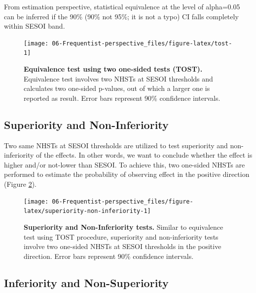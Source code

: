 \documentclass[
]{book}
\begin{document}
From estimation perspective, statistical equivalence at the level of alpha=0.05 can be inferred if the 90\% (90\% not 95\%; it is not a typo) CI falls completely within SESOI band.

\begin{figure}

{\centering \texttt{[image: 06-Frequentist-perspective\_files/figure-latex/tost-1]} 

}

\caption{\textbf{Equivalence test using two one-sided tests (TOST). }Equivalence test involves two NHSTs at SESOI thresholds and calculates two one-sided p-values, out of which a larger one is reported as result. Error bars represent 90\% confidence intervals.}\label{fig:tost}
\end{figure}



\hypertarget{superiority-and-non-inferiority}{%
\subsection{Superiority and Non-Inferiority}\label{superiority-and-non-inferiority}}

Two same NHSTs at SESOI thresholds are utilized to test superiority and non-inferiority of the effects. In other words, we want to conclude whether the effect is higher and/or not-lower than SESOI. To achieve this, two one-sided NHSTs are performed to estimate the probability of observing effect in the positive direction (Figure \ref{fig:superiority-non-inferiority}).

\begin{figure}

{\centering \texttt{[image: 06-Frequentist-perspective\_files/figure-latex/superiority-non-inferiority-1]} 

}

\caption{\textbf{Superiority and Non-Inferiority tests. }Similar to equivalence test using TOST procedure, superiority and non-inferiority tests involve two one-sided NHSTs at SESOI thresholds in the positive direction. Error bars represent 90\% confidence intervals.}\label{fig:superiority-non-inferiority}
\end{figure}



\hypertarget{inferiority-and-non-superiority}{%
\subsection{Inferiority and Non-Superiority}\label{inferiority-and-non-superiority}}
\end{document}
